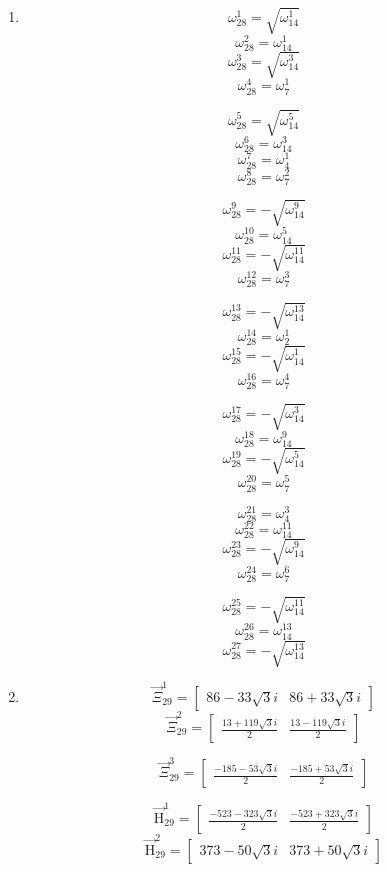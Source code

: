 \documentclass{article}
\begin{document}
\begin{enumerate}
\[ \omega_{27}^{21}=\omega_{9}^{7} \]
\[ \omega_{27}^{22}=\omega_{3}^{2}\sqrt[3]{\omega_{9}^{4}} \]
\[ \omega_{27}^{23}=\sqrt[3]{\omega_{9}^{5}} \]
\[ \omega_{27}^{24}=\omega_{9}^{8} \]
\[ \omega_{27}^{25}=\sqrt[3]{\omega_{9}^{7}} \]

\[ \omega_{27}^{26}=\sqrt[3]{\omega_{9}^{8}} \]

\item \[ \omega_{28}^{1}=\sqrt{\omega_{14}^{1}} \]
\[ \omega_{28}^{2}=\omega_{14}^{1} \]
\[ \omega_{28}^{3}=\sqrt{\omega_{14}^{3}} \]
\[ \omega_{28}^{4}=\omega_{7}^{1} \]

\[ \omega_{28}^{5}=\sqrt{\omega_{14}^{5}} \]
\[ \omega_{28}^{6}=\omega_{14}^{3} \]
\[ \omega_{28}^{7}=\omega_{4}^{1} \]
\[ \omega_{28}^{8}=\omega_{7}^{2} \]

\[ \omega_{28}^{9}=-\sqrt{\omega_{14}^{9}} \]
\[ \omega_{28}^{10}=\omega_{14}^{5} \]
\[ \omega_{28}^{11}=-\sqrt{\omega_{14}^{11}} \]
\[ \omega_{28}^{12}=\omega_{7}^{3} \]

\[ \omega_{28}^{13}=-\sqrt{\omega_{14}^{13}} \]
\[ \omega_{28}^{14}=\omega_{2}^{1} \]
\[ \omega_{28}^{15}=-\sqrt{\omega_{14}^{1}} \]
\[ \omega_{28}^{16}=\omega_{7}^{4} \]

\[ \omega_{28}^{17}=-\sqrt{\omega_{14}^{3}} \]
\[ \omega_{28}^{18}=\omega_{14}^{9} \]
\[ \omega_{28}^{19}=-\sqrt{\omega_{14}^{5}} \]
\[ \omega_{28}^{20}=\omega_{7}^{5} \]

\[ \omega_{28}^{21}=\omega_{4}^{3} \]
\[ \omega_{28}^{22}=\omega_{14}^{11} \]
\[ \omega_{28}^{23}=-\sqrt{\omega_{14}^{9}} \]
\[ \omega_{28}^{24}=\omega_{7}^{6} \]

\[ \omega_{28}^{25}=-\sqrt{\omega_{14}^{11}} \]
\[ \omega_{28}^{26}=\omega_{14}^{13} \]
\[ \omega_{28}^{27}=-\sqrt{\omega_{14}^{13}} \]

\item \[ \vec{\Xi}_{29}^{1}=\left[ \begin{matrix} 86-33\sqrt{3}i & 86+33\sqrt{3}i \end{matrix} \right] \]
\[ \vec{\Xi}_{29}^{2}=\left[ \begin{matrix} \frac{13+119\sqrt{3}i}{2} & \frac{13-119\sqrt{3}i}{2} \end{matrix} \right] \]

\[ \vec{\Xi}_{29}^{3}=\left[ \begin{matrix} \frac{-185-53\sqrt{3}i}{2} & \frac{-185+53\sqrt{3}i}{2} \end{matrix} \right] \]

\[ \vec{\mathrm{H}}_{29}^{1}=\left[ \begin{matrix} \frac{-523-323\sqrt{3}i}{2} & \frac{-523+323\sqrt{3}i}{2} \end{matrix} \right] \]
\[ \vec{\mathrm{H}}_{29}^{2}=\left[ \begin{matrix} 373-50\sqrt{3}i & 373+50\sqrt{3}i \end{matrix} \right] \]


\end{enumerate}
\end{document}
